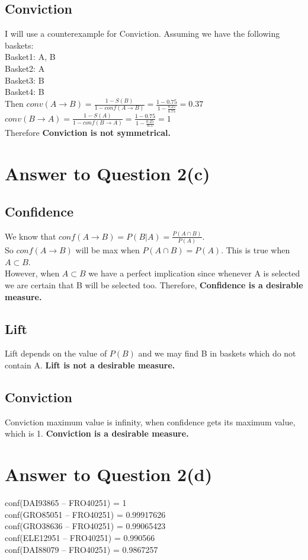 \documentclass[11pt]{article}
\begin{document}
\subsection*{Conviction}
I will use a counterexample for Conviction. Assuming we have the following baskets:\\
Basket1: A, B \\
Basket2: A\\
Basket3: B\\
Basket4: B\\
Then $ conv(A \rightarrow B) = \frac{1-S(B)}{1 - conf(A \rightarrow B)} = \frac{1 - 0.75}{1 - \frac{0.25}{0.75}} = 0.37$ \\
$ conv(B \rightarrow A) = \frac{1-S(A)}{1 - conf(B \rightarrow A)} = \frac{1 - 0.75}{1 - \frac{0.25}{0.5}} = 1$\\
 Therefore \textbf{Conviction is not symmetrical.}
\pagebreak[4]
\section*{Answer to Question 2(c)}
\subsection*{Confidence}
We know that
$conf( A \rightarrow B) = P(B|A) = \frac{P(A\cap B)}{P(A)}$. \\
So  $conf( A \rightarrow B)$ will be max when $P(A\cap B) = P(A)$. This is true when $A\subset B$.\\
However, when $A\subset B$ we have a perfect implication since whenever A is selected we are certain that B will be selected too. Therefore, \textbf{Confidence is a desirable measure.}
\subsection*{Lift}
Lift depends on the value of $P(B)$ and we may find B in baskets which do not contain A. \textbf{Lift is not a desirable measure.}
\subsection*{Conviction}
Conviction maximum value is infinity, when confidence gets its maximum value, which is 1. \textbf{Conviction is a desirable measure.}
\pagebreak[4]
\section*{Answer to Question 2(d)}
conf(DAI93865 -- FRO40251) =	1 \\
conf(GRO85051 -- FRO40251) =	0.99917626 \\
conf(GRO38636 -- FRO40251) =	0.99065423 \\
conf(ELE12951 -- FRO40251) =	0.990566 \\
conf(DAI88079 -- FRO40251) =	0.9867257 \\
\end{document}
